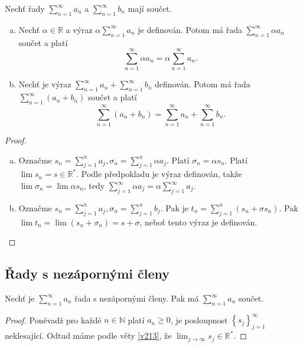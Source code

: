 \begin{veta}\label{veta7.3}
Nechť řady $\sum_{n=1}^\infty a_n$ a $\sum_{n=1}^\infty b_n$ mají součet.
\begin{enumerate}[(a)]
	\item Nechť $\alpha \in \mathbb R $ a výraz $\alpha\sum_{n=1}^\infty a_n$ je definován.
	Potom má řada $\sum_{n=1}^\infty \alpha a_n$ součet a platí
	$$
	    \sum_{n=1}^\infty \alpha a_n = \alpha\sum_{n=1}^\infty a_n.
	$$
	\item Nechť je výraz $\sum_{n=1}^\infty a_n+\sum_{n=1}^\infty b_n$ definován.
	Potom má řada $\sum_{n=1}^\infty (a_n+b_n)$ součet a platí
	$$
	    \sum_{n=1}^\infty (a_n+b_n) = \sum_{n=1}^\infty a_n +\sum_{n=1}^\infty b_n.
	$$
\end{enumerate}
\end{veta}

\begin{proof}
	\,
	\begin{enumerate}[(a)]
		\item Označme $s_n = \sum_{j=1}^n a_j, \sigma_n= \sum_{j=1}^n \alpha a_j$. Platí $\sigma_n = \alpha s_n$.
		Platí $\lim s_n = s \in \mathbb R ^*$. Podle předpokladu je výraz definován, takže
		$\lim \sigma _n = \lim \alpha s_n$, tedy $\sum_{j=1}^\infty \alpha a_j = \alpha \sum_{j=1}^\infty  a_j$.
		\item Označme $s_n = \sum_{j=1}^n a_j, \sigma_n= \sum_{j=1}^n b_j$. Pak je
		$t_n = \sum_{j=1}^n \left( s_n + \sigma s_n \right ) $. Pak $\lim t_n = \lim \left( s_n + \sigma_n \right )  = s + \sigma$,
		neboť tento výraz je definován.\qedhere
	\end{enumerate}
\end{proof}

\subsection{Řady s nezápornými členy}
\begin{veta}\label{veta7.4}
Nechť je $\sum_{n=1}^\infty a_n$ řada s nezápornými členy. Pak má $\sum_{n=1}^\infty a_n$ součet.
\end{veta}

\begin{proof}
	Poněvadž pro každé $n \in \mathbb N $ platí $a_n \geq 0$, je posloupnost $\left \{ s_j \right \}_{j=1}^\infty $
	neklesající. Odtud máme podle věty \ref{v213}, že $\lim_{j\to \infty} s_j \in \mathbb R ^*$.
\end{proof}

